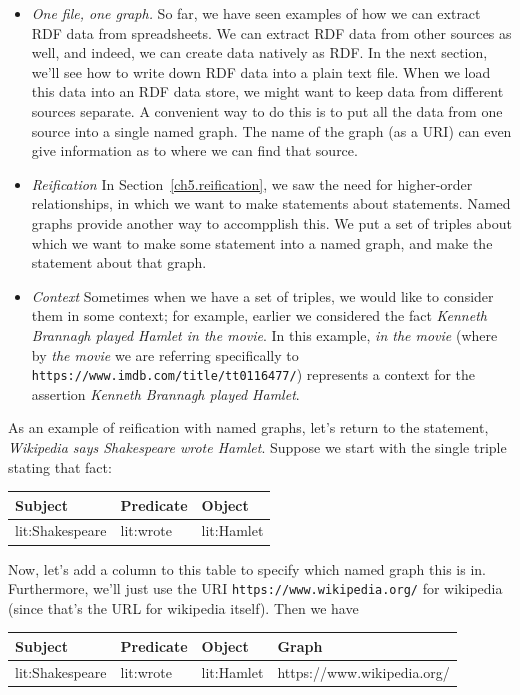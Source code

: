 \begin{itemize}
    \item \emph{One file, one graph.} So far, we have seen examples of how we can 
    extract RDF data from spreadsheets.  We can extract RDF data from other sources as well, 
    and indeed, we can create data natively as RDF.  In the next section, we'll see how 
    to write down RDF data into a plain text file.  When we load this data into an RDF data store, we might want to keep data from different sources separate.  A convenient way to do this is to put all the data from one source into a single named graph.  The name of the graph (as a URI) can even give information as to where we can find that source.
    \item \emph{Reification} In Section~\ref{ch5.reification}, we saw the need for higher-order relationships, in which we want to make statements about statements.  Named graphs provide another way to accompplish this.  We put a set of triples about which we want to make some statement into a named graph, and make the statement about that graph.
    \item \emph{Context} Sometimes when we have a set of triples, we would like to consider them in some context; for example, earlier we considered the fact \emph{Kenneth Brannagh played Hamlet in the movie}.  In this example, \emph{in the movie} (where by \emph{the movie} we are referring specifically to \texttt{https://www.imdb.com/title/tt0116477/}) represents a context for the assertion \emph{Kenneth Brannagh played Hamlet}. 
\end{itemize}

As an example of reification with named graphs, let's return to the statement, \emph{Wikipedia says Shakespeare wrote Hamlet}.   Suppose we start with the single triple stating that fact:

\begin{tabular}{|lll|}
\hline
Subject&Predicate&Object\\
\hline
lit:Shakespeare&lit:wrote&lit:Hamlet \\
\hline
\end{tabular}

Now, let's add a column to this table to specify which named graph this is in.  Furthermore, 
we'll just use the URI \texttt{https://www.wikipedia.org/} for wikipedia (since that's the 
URL for wikipedia itself).  Then we have 

\begin{tabular}{|llll|}
\hline
Subject&Predicate&Object&Graph\\
\hline
lit:Shakespeare&lit:wrote&lit:Hamlet&https://www.wikipedia.org/ \\
\hline
\end{tabular}


